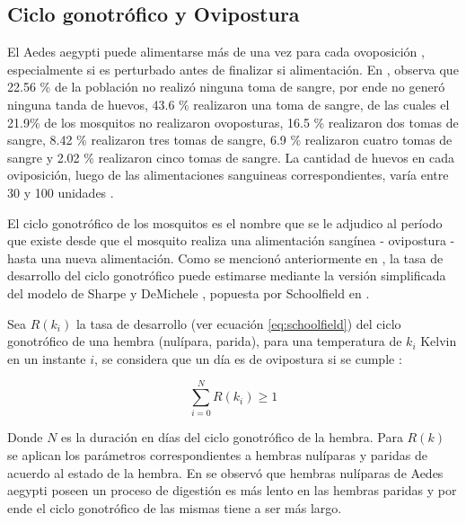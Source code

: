 \subsection{Ciclo gonotrófico y Ovipostura}
\label{subsec:cap4-ciclo-gontrofico-ovipostura}
El Aedes aegypti puede alimentarse más de una vez para cada ovoposición \cite{scott1993detection},
especialmente si es perturbado antes de finalizar si alimentación. En \cite{osoriopontificia},
observa que  22.56 \% de la población no realizó ninguna toma de sangre, por ende no generó
ninguna tanda de huevos,  43.6 \% realizaron una toma de sangre, de las cuales el 21.9\% de los
mosquitos no realizaron ovoposturas, 16.5 \% realizaron dos tomas de sangre, 8.42 \% realizaron
tres tomas de sangre, 6.9 \% realizaron cuatro tomas de sangre y 2.02 \% realizaron cinco tomas de
sangre. La cantidad de huevos en cada oviposición, luego de las alimentaciones sanguineas
correspondientes, varía entre 30 y 100 unidades \cite{luevano1993ciclo, beltran2001bionomia,cabezas2005dengue}.

El ciclo gonotrófico de los mosquitos es el nombre que se le adjudico al período que existe desde
que el mosquito realiza una alimentación sangínea - ovipostura - hasta una nueva alimentación.
Como se mencionó anteriormente en , la tasa de desarrollo
del ciclo gonotrófico puede estimarse mediante la versión simplificada del modelo de Sharpe y DeMichele \cite{sharpe1977reaction}, popuesta por Schoolfield en \cite{schoolfield1981non}.

Sea $R(k_{i})$ la tasa de desarrollo (ver ecuación \eqref{eq:schoolfield}) del ciclo gonotrófico
de una hembra (nulípara, parida), para una temperatura de $k_{i}$ Kelvin en un instante $i$, se
considera que un día es de ovipostura si se cumple :

\begin{equation}
\label{eq:ciclo-gonotrofico-ovipostura}
    \sum_{i=0}^{N} R(k_{i}) \geq 1
\end{equation}

Donde $N$ es la duración en días del ciclo gonotrófico de la hembra. Para $R(k)$ se aplican los
parámetros correspondientes a hembras nulíparas y paridas de acuerdo al estado de la hembra.
En \cite{edman1987host} se observó que hembras nulíparas de Aedes aegypti poseen un proceso de
digestión es más lento en las hembras paridas y por ende el ciclo gonotrófico de las mismas tiene
a ser más largo.
